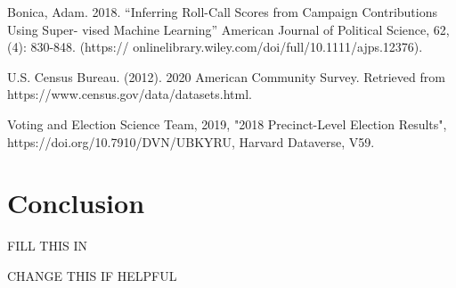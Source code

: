 \documentclass{article}
\begin{document}
Bonica, Adam. 2018. “Inferring Roll-Call Scores from Campaign Contributions Using Super-
vised Machine Learning” American Journal of Political Science, 62, (4): 830-848. (https://
onlinelibrary.wiley.com/doi/full/10.1111/ajps.12376).

U.S. Census Bureau. (2012). 2020 American Community Survey.  
Retrieved from https://www.census.gov/data/datasets.html.

Voting and Election Science Team, 2019, "2018 Precinct-Level Election Results", 
https://doi.org/10.7910/DVN/UBKYRU, Harvard Dataverse, V59.


\section{Conclusion}

FILL THIS IN

\begin{itemize}
CHANGE THIS IF HELPFUL
\end{itemize}
\end{document}
